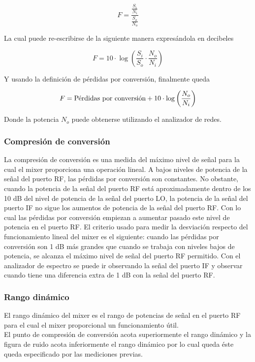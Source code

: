 \documentclass[a4paper,10pt]{article}
\begin{document}
	$$F=\frac{\frac{S_i}{N_i}}{\frac{S_o}{N_o}}$$
	
	\indent La cual puede re-escribirse de la siguiente manera expres\'andola en
	decibeles 
		
	$$F=10\cdot\log\left(\frac{S_i}{S_o}\cdot\frac{N_o}{N_i}\right)$$
	
	\indent Y usando la definici\'on de p\'erdidas por conversi\'on, finalmente 
	queda
		
	$$F=\textmd{P\'erdidas por conversi\'on}+10\cdot\log\left(
	\frac{N_o}{N_i}\right)$$
		
	\indent Donde la potencia $N_o$ puede obtenerse utilizando el analizador de 
	redes.
		
	\subsubsection{Compresi\'on de conversi\'on}
	\indent La compresi\'on de conversi\'on es una medida del m\'aximo nivel de 
	se\~nal para la cual el mixer proporciona una operaci\'on lineal. A bajos 
	niveles de potencia de la se\~nal del puerto RF, las p\'erdidas por 
	conversi\'on son constantes. No obstante, cuando la potencia de la se\~nal 
	del puerto RF est\'a aproximadamente dentro de los 10 dB del nivel de 
	potencia de la se\~nal del puerto LO, la potencia de la se\~nal del puerto 
	IF no sigue los aumentos de potencia de la se\~nal del puerto RF. Con lo 
	cual las p\'erdidas por conversi\'on empiezan a aumentar pasado este nivel 
	de potencia en el puerto RF. El criterio usado para medir la desviaci\'on 
	respecto del funcionamiento lineal del mixer es el siguiente: cuando las 
	p\'erdidas por conversi\'on son 1 dB m\'as grandes que cuando se trabaja con
	niveles bajos de potencia, se alcanza el m\'aximo nivel de se\~nal del 
	puerto RF permitido. Con el analizador de espectro se puede ir observando la
	se\~nal del puerto IF y observar cuando tiene una diferencia extra de 1 dB 
	con la se\~nal del puerto RF. 
		
	\subsubsection{Rango din\'amico}
	\indent	El rango din\'amico del mixer es el rango de potencias de se\~nal en
	el puerto RF para el cual el mixer proporcional un funcionamiento \'util. \\
	\indent	El punto de compresi\'on de conversi\'on acota superiormente el 
	rango din\'amico y la figura de ruido acota inferiormente el rango 
	din\'amico por lo cual queda \'este queda especificado por las mediciones 
	previas.
\end{document}
